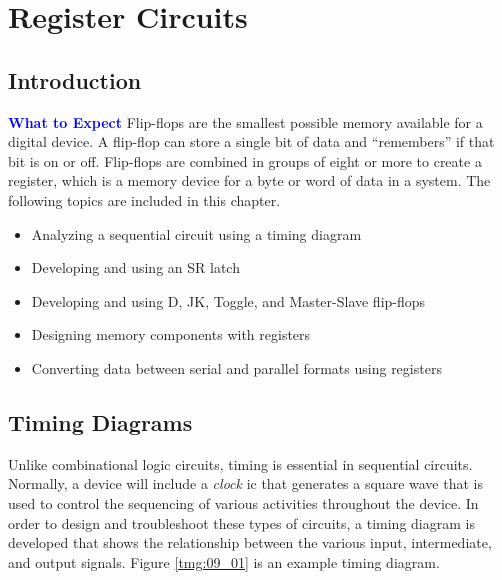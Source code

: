 \chapter{Register Circuits}\label{ch10}
\section{Introduction}

\begin{tcolorbox}[colback=blue!5!white,colframe=blue!75!black]
	\textcolor{blue}{\textbf{What to Expect}}
	\tcblower
	Flip-flops are the smallest possible memory available for a digital device. A flip-flop can store a single bit of data and ``remembers'' if that bit is on or off. Flip-flops are combined in groups of eight or more to create a register, which is a memory device for a byte or word of data in a system. The following topics are included in this chapter.
	
	\begin{itemize}
		\item Analyzing a sequential circuit using a timing diagram
		\item Developing and using an SR latch
		\item Developing and using D, JK, Toggle, and Master-Slave flip-flops
		\item Designing memory components with registers
		\item Converting data between serial and parallel formats using registers
	\end{itemize}

\end{tcolorbox}

\section{Timing Diagrams}
\label{SL:sec:timing_diagrams}

Unlike combinational logic circuits, timing is essential in sequential circuits. Normally, a device will include a \emph{clock} \gls{ic} that generates a square wave that is used to control the sequencing of various activities throughout the device. In order to design and troubleshoot these types of circuits, a timing diagram is developed that shows the relationship between the various input, intermediate, and output signals. Figure \ref{tmg:09_01} is an example timing diagram.

